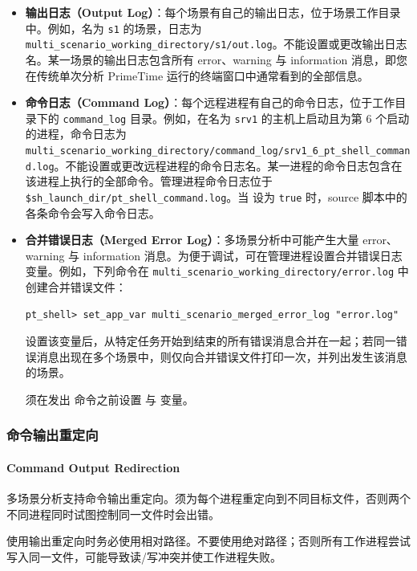\begin{itemize}
  \item \textbf{输出日志（Output Log）}：每个场景有自己的输出日志，位于场景工作目录中。例如，名为 \texttt{s1} 的场景，日志为 \texttt{multi\_scenario\_working\_directory/s1/out.log}。不能设置或更改输出日志名。某一场景的输出日志包含所有 error、warning 与 information 消息，即您在传统单次分析 PrimeTime 运行的终端窗口中通常看到的全部信息。
  \item \textbf{命令日志（Command Log）}：每个远程进程有自己的命令日志，位于工作目录下的 \texttt{command\_log} 目录。例如，在名为 \texttt{srv1} 的主机上启动且为第 6 个启动的进程，命令日志为 \texttt{multi\_scenario\_working\_directory/command\_log/srv1\_6\_pt\_shell\_command.log}。不能设置或更改远程进程的命令日志名。某一进程的命令日志包含在该进程上执行的全部命令。管理进程命令日志位于 \texttt{\$sh\_launch\_dir/pt\_shell\_command.log}。当  设为 \texttt{true} 时，source 脚本中的各条命令会写入命令日志。
  \item \textbf{合并错误日志（Merged Error Log）}：多场景分析中可能产生大量 error、warning 与 information 消息。为便于调试，可在管理进程设置合并错误日志变量。例如，下列命令在 \texttt{multi\_scenario\_working\_directory/error.log} 中创建合并错误文件：
\begin{lstlisting}
pt_shell> set_app_var multi_scenario_merged_error_log "error.log"
\end{lstlisting}
        设置该变量后，从特定任务开始到结束的所有错误消息合并在一起；若同一错误消息出现在多个场景中，则仅向合并错误文件打印一次，并列出发生该消息的场景。
\begin{noteBox}
须在发出  命令之前设置  与  变量。
\end{noteBox}
\end{itemize}

\subsubsection{命令输出重定向}
\paragraph*{Command Output Redirection}

多场景分析支持命令输出重定向。须为每个进程重定向到不同目标文件，否则两个不同进程同时试图控制同一文件时会出错。

\begin{noteBox}
使用输出重定向时务必使用相对路径。不要使用绝对路径；否则所有工作进程尝试写入同一文件，可能导致读/写冲突并使工作进程失败。
\end{noteBox}

